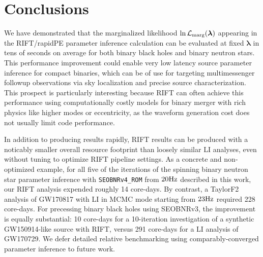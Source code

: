 \documentclass[twocolumn,prd,nofootinbib]{revtex4}
\newcommand\SkipForEarlyCirculation[1]{}
\newcommand\AddedResponse[1]{{\color{blue} {#1}}}
\newcommand\unit[1]{{\rm #1}}
\newcommand\editremark[1]{{\color{red} #1}}
\begin{document}
\SkipForEarlyCirculation{
\section{ Results (optional?)}

*   Rerun all O2 BBHs with SEOBNRv3?  

* PP plot demo for zero-spin binaries, with profiling of full run?  

* reminder: HM for BNS break degeneracy, useful for source classification.  Show an example.

\editremark{bonus mentions}: eccentricity

Bonus code: lnLcut tapering, possibly neff tapering

Puffball in DAG every few iterations, to insure stability around edges and not overcover the core

}

\section{Conclusions}
\label{sec:conclude}
We have demonstrated that the marginalized likelihood $\ln {\cal L}_{\rm marg}(\bm{\lambda})$ appearing in the RIFT/rapidPE parameter
inference calculation can be evaluated at fixed $\bm{\lambda}$ in tens of seconds on average for
both binary black holes and binary neutron stars.  This performance improvement could enable very low latency source
parameter inference for compact binaries, which can be of use for targeting multimessenger followup observations via sky
localization and  precise source characterization.     This prospect is particularly interesting because RIFT can
often achieve this performance using computationally costly models for binary merger with rich physics like higher modes
or eccentricity, as the waveform generation cost does not usually limit code performance.   

\AddedResponse{In addition to producing results rapidly, RIFT results can be produced with a noticably smaller overall resource footprint than
  loosely similar LI analyses, even without tuning to optimize  RIFT pipeline settings.  As a concrete and non-optimized
  example,  for all five of the iterations of the spinning binary neutron star parameter inference with \texttt{SEOBNRv4\_ROM} from
  $20\unit{Hz}$ described in this work, our  RIFT analysis expended  roughly 14 core-days.  By contrast, a TaylorF2 analysis of GW170817
  with LI in MCMC mode starting from $23\unit{Hz}$ required 228 core-days.  %
  For precessing binary black holes using SEOBNRv3, the improvement is equally substantial: 10 core-days for a
  10-iteration investigation of a synthetic GW150914-like source with RIFT, versus 291 core-days for a LI analysis of
  GW170729.  
  We defer detailed relative benchmarking using comparably-converged parameter inference to future work.
}
\end{document}
